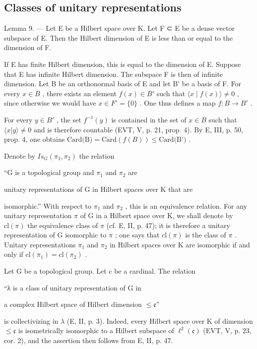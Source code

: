 \subsection{Classes of unitary representations}

Lemma 9. --- Let E be a Hilbert space over K. Let F ⊂ E be a dense vector subspace of E. Then the Hilbert dimension of E is less than or equal to the dimension of F.

If E has finite Hilbert dimension, this is equal to the dimension of E. Suppose that E has infinite Hilbert dimension. The subspace F is then of infinite dimension. Let B be an orthonormal basis of E and let B' be a basis of F. For every \(x \in B\) , there exists an element \(f(x) \in B'\) such that \(\langle x \mid f(x) \rangle \neq 0\) , since otherwise we would have \(x \in F^{\circ} = \{0\}\) . One thus defines a map \(f: B \to B'\) .

For every \(y \in B'\) , the set \(f^{-1}(y)\) is contained in the set of \(x \in B\) such that \(\langle x | y \rangle \neq 0\) and is therefore countable (EVT, V, p. 21, prop. 4). By E, III, p. 50, prop. 4, one obtains \(\text{Card(B)} = \text{Card}(f(B)) \leqslant \text{Card(B')}\) .

Denote by \(Is_{G}(\pi_{1},\pi_{2})\) the relation

“G is a topological group and \(\pi_{1}\) and \(\pi_{2}\) are

unitary representations of G in Hilbert spaces over K that are

isomorphic.” With respect to \(\pi_{1}\) and \(\pi_{2}\) , this is an equivalence relation. For any unitary representation \(\pi\) of G in a Hilbert space over K, we shall denote by \(\mathrm{cl}(\pi)\) the equivalence class of \(\pi\) (cf. E, II, p. 47); it is therefore a unitary representation of G isomorphic to \(\pi\) ; one says that \(\mathrm{cl}(\pi)\) is the class of \(\pi\) . Unitary representations \(\pi_{1}\) and \(\pi_{2}\) in Hilbert spaces over K are isomorphic if and only if \(\mathrm{cl}(\pi_{1}) = \mathrm{cl}(\pi_{2})\) .

Let G be a topological group. Let c be a cardinal. The relation

“λ is a class of unitary representation of G in

a complex Hilbert space of Hilbert dimension \(\leqslant\mathfrak{c}\)”

is collectivizing in \(\lambda\) (E, II, p. 3). Indeed, every Hilbert space over K of dimension \(\leqslant \mathfrak{c}\) is isometrically isomorphic to a Hilbert subspace of \(\ell^2 (\mathfrak{c})\) (EVT, V, p. 23, cor. 2), and the assertion then follows from E, II, p. 47.

